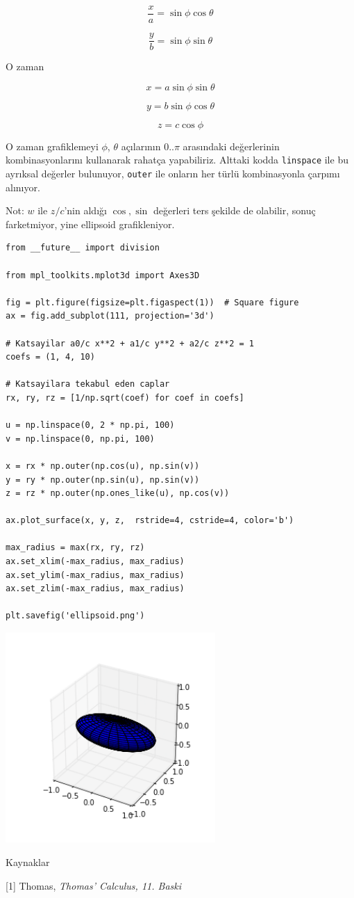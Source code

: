 \documentclass[12pt,fleqn]{article}\usepackage{../../common}
\begin{document}
$$ \frac{x}{a} = \sin\phi \cos \theta  $$

$$ \frac{y}{b} = \sin\phi \sin\theta  $$

O zaman

$$ x = a \sin\phi \sin \theta  $$

$$ y = b \sin\phi \cos \theta  $$

$$ z = c \cos \phi $$

O zaman grafiklemeyi $\phi$, $\theta$ açılarının $0..\pi$ arasındaki
değerlerinin kombinasyonlarını kullanarak rahatça yapabiliriz. Alttaki kodda
\verb!linspace! ile bu ayrıksal değerler bulunuyor, \verb!outer! ile onların her
türlü kombinasyonla çarpımı alınıyor.

Not: $w$ ile $z/c$'nin aldığı $\cos, \sin$ değerleri ters şekilde de olabilir,
sonuç farketmiyor, yine ellipsoid grafikleniyor. 

\begin{verbatim}
from __future__ import division

from mpl_toolkits.mplot3d import Axes3D

fig = plt.figure(figsize=plt.figaspect(1))  # Square figure
ax = fig.add_subplot(111, projection='3d')

# Katsayilar a0/c x**2 + a1/c y**2 + a2/c z**2 = 1 
coefs = (1, 4, 10)  

# Katsayilara tekabul eden caplar
rx, ry, rz = [1/np.sqrt(coef) for coef in coefs]

u = np.linspace(0, 2 * np.pi, 100)
v = np.linspace(0, np.pi, 100)

x = rx * np.outer(np.cos(u), np.sin(v))
y = ry * np.outer(np.sin(u), np.sin(v))
z = rz * np.outer(np.ones_like(u), np.cos(v))

ax.plot_surface(x, y, z,  rstride=4, cstride=4, color='b')

max_radius = max(rx, ry, rz)
ax.set_xlim(-max_radius, max_radius)
ax.set_ylim(-max_radius, max_radius)
ax.set_zlim(-max_radius, max_radius)

plt.savefig('ellipsoid.png')
\end{verbatim}
\begin{center}
\includegraphics[height=8cm]{ellipsoid.png}
\end{center}

Kaynaklar

[1] Thomas, {\em Thomas' Calculus, 11. Baski}
\end{document}
